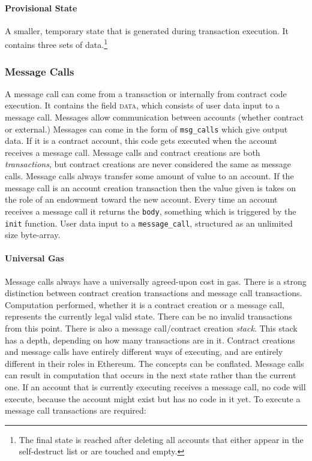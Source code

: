 \documentclass[10pt,a4paper,leqno,bibliography=totoc]{scrartcl}
\newenvironment{alphafootnotes}
{\par\edef\savedfootnotenumber{\number\value{footnote}}
\renewcommand{\thefootnote}{\alph{footnote}}
\setcounter{footnote}{0}}
{\par\setcounter{footnote}{\savedfootnotenumber}}
\begin{document}
\begin{alphafootnotes}
\begin{multicols*}{2}
				\paragraph{Provisional State}
				A smaller, temporary state that is generated during transaction execution. It contains three sets of data.\footnote{The final state is reached after deleting all accounts that either appear in the self-destruct list or are touched and empty.}

			\subsubsection{Message Calls}
			A message call can come from a transaction or internally from contract code execution. It contains the field \textsc{data}, which consists of user data input to a message call. Messages allow communication between accounts (whether contract or external.) Messages can come in the form of \texttt{msg\_calls} which give output data. If it is a contract account, this code gets executed when the account receives a message call. Message calls and contract creations are both \textsl{transactions}, but contract creations are never considered the same as message calls. Message calls always transfer some amount of value to an account. If the message call is an account creation transaction then the value given is takes on the role of an endowment toward the new account. Every time an account receives a message call it returns the \texttt{body}, something which is triggered by the \texttt{init} function. User data input to a \texttt{message\_call}, structured as an unlimited size byte-array.

\paragraph{Universal Gas}Message calls always have a universally agreed-upon cost in gas. There is a strong distinction between contract creation transactions and message call transactions. Computation performed, whether it is a contract creation or a message call, represents the currently legal valid state. There can be no invalid transactions from this point. \supercite{Wood2017} There is also a message call/contract creation \textit{stack}. This stack has a depth, depending on how many transactions are in it. Contract creations and message calls have entirely different ways of executing, and are entirely different in their roles in Ethereum. The concepts can be conflated. Message calls can result in computation that occurs in the next state rather than the current one. If an account that is currently executing receives a message call, no code will execute, because the account might exist but has no code in it yet. To execute a message call transactions are required:


\end{multicols*}
\end{alphafootnotes}
\end{document}
